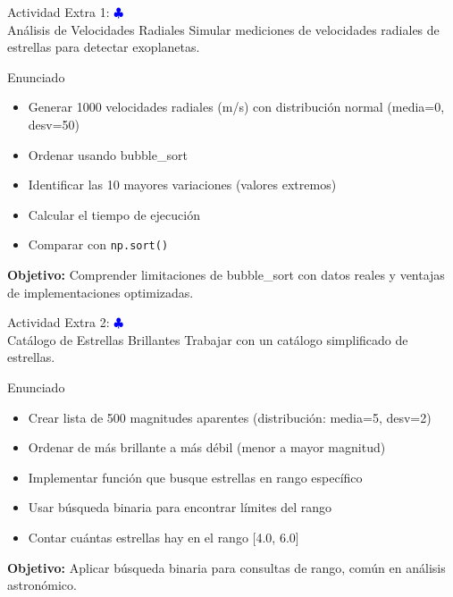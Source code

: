 \documentclass[10pt]{beamer}
\begin{document}
\begin{frame}{Actividad Extra 1: \hfill \textcolor{blue}{$\clubsuit$} \\ Análisis de Velocidades Radiales}
  Simular mediciones de velocidades radiales de estrellas para detectar exoplanetas.
  
  \begin{block}{Enunciado}
    \begin{itemize}
      \item Generar 1000 velocidades radiales (m/s) con distribución normal (media=0, desv=50)
      \item Ordenar usando bubble\_sort
      \item Identificar las 10 mayores variaciones (valores extremos)
      \item Calcular el tiempo de ejecución
      \item Comparar con \texttt{np.sort()}
    \end{itemize}
  \end{block}
  
  \textbf{Objetivo:} Comprender limitaciones de bubble\_sort con datos reales 
  y ventajas de implementaciones optimizadas.
\end{frame}

\begin{frame}{Actividad Extra 2: \hfill \textcolor{blue}{$\clubsuit$} \\ Catálogo de Estrellas Brillantes}
  Trabajar con un catálogo simplificado de estrellas.
  
  \begin{block}{Enunciado}
    \begin{itemize}
      \item Crear lista de 500 magnitudes aparentes (distribución: media=5, desv=2)
      \item Ordenar de más brillante a más débil (menor a mayor magnitud)
      \item Implementar función que busque estrellas en rango específico
      \item Usar búsqueda binaria para encontrar límites del rango
      \item Contar cuántas estrellas hay en el rango [4.0, 6.0]
    \end{itemize}
  \end{block}
  
  \textbf{Objetivo:} Aplicar búsqueda binaria para consultas de rango, 
  común en análisis astronómico.
\end{frame}
\end{document}
